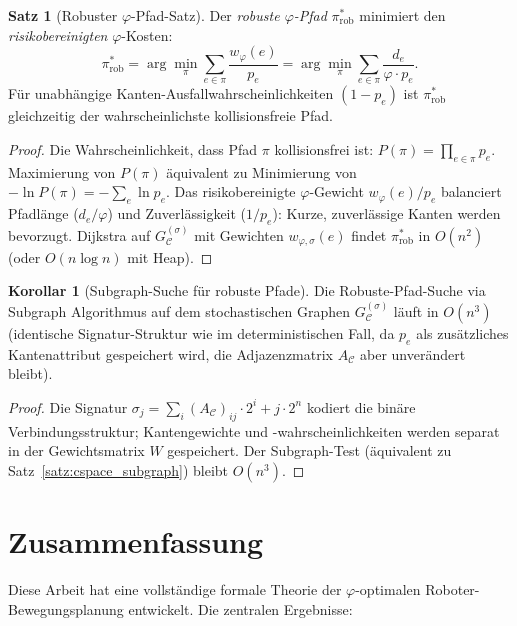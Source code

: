 ﻿\documentclass[a4paper,12pt]{article}
\theoremstyle{definition}
\newtheorem{satz}{Satz}
\newtheorem{korollar}{Korollar}
\newcommand{\Cspace}{\mathcal{C}}
\begin{document}
\begin{satz}[Robuster $\varphi$-Pfad-Satz]
\label{satz:robust_phi}
Der \emph{robuste $\varphi$-Pfad} $\pi^*_{\mathrm{rob}}$ minimiert den
\emph{risikobereinigten} $\varphi$-Kosten:
\[
\pi^*_{\mathrm{rob}} = \arg\min_\pi \sum_{e \in \pi} \frac{w_\varphi(e)}{p_e}
= \arg\min_\pi \sum_{e \in \pi} \frac{d_e}{\varphi \cdot p_e}.
\]
F\"ur unabh\"angige Kanten-Ausfallwahrscheinlichkeiten $(1-p_e)$
ist $\pi^*_{\mathrm{rob}}$ gleichzeitig der wahrscheinlichste
kollisionsfreie Pfad.
\end{satz}

\begin{proof}
Die Wahrscheinlichkeit, dass Pfad $\pi$ kollisionsfrei ist:
$P(\pi) = \prod_{e \in \pi} p_e$.
Maximierung von $P(\pi)$ \"aquivalent zu Minimierung von
$-\ln P(\pi) = -\sum_e \ln p_e$.
Das risikobereinigte $\varphi$-Gewicht $w_\varphi(e)/p_e$
balanciert Pfadl\"ange ($d_e/\varphi$) und Zuverl\"assigkeit ($1/p_e$):
Kurze, zuverl\"assige Kanten werden bevorzugt.
Dijkstra auf $G_{\Cspace}^{(\sigma)}$ mit Gewichten $w_{\varphi,\sigma}(e)$
findet $\pi^*_{\mathrm{rob}}$ in $O(n^2)$ (oder $O(n \log n)$ mit Heap).
\end{proof}

\begin{korollar}[Subgraph-Suche f\"ur robuste Pfade]
Die Robuste-Pfad-Suche via Subgraph Algorithmus auf dem
stochastischen Graphen $G_{\Cspace}^{(\sigma)}$ l\"auft in $O(n^3)$
(identische Signatur-Struktur wie im deterministischen Fall,
da $p_e$ als zus\"atzliches Kantenattribut gespeichert wird, die
Adjazenzmatrix $A_{\Cspace}$ aber unver\"andert bleibt).
\end{korollar}

\begin{proof}
Die Signatur $\sigma_j = \sum_i (A_{\Cspace})_{ij} \cdot 2^i + j \cdot 2^n$
kodiert die bin\"are Verbindungsstruktur; Kantengewichte und
-wahrscheinlichkeiten werden separat in der Gewichtsmatrix $W$ gespeichert.
Der Subgraph-Test (\"aquivalent zu Satz~\ref{satz:cspace_subgraph}) bleibt $O(n^3)$.
\end{proof}

\section{Zusammenfassung}

Diese Arbeit hat eine vollst\"andige formale Theorie der $\varphi$-optimalen
Roboter-Bewegungsplanung entwickelt. Die zentralen Ergebnisse:
\end{document}
